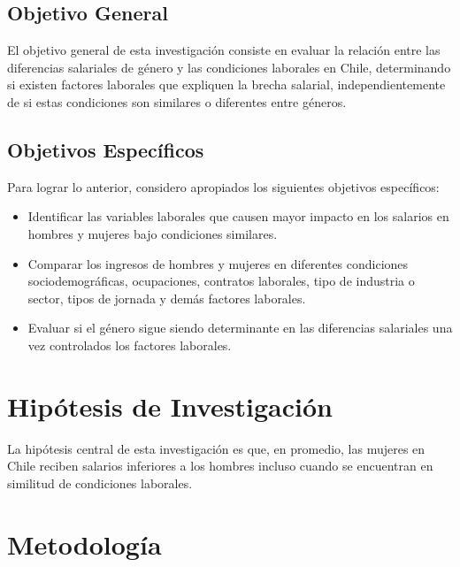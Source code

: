 \subsection{Objetivo General}


El objetivo general de esta investigación consiste en evaluar la relación entre las diferencias salariales de género y las condiciones laborales en Chile, determinando si existen factores laborales que expliquen la brecha salarial, independientemente de si estas condiciones son similares o diferentes entre géneros.

\subsection{Objetivos Específicos}


Para lograr lo anterior, considero apropiados los siguientes objetivos específicos:

\begin{itemize}
	\item Identificar las variables laborales que causen mayor impacto en los salarios en hombres y mujeres bajo condiciones similares.
	\item Comparar los ingresos de hombres y mujeres en diferentes condiciones sociodemográficas, ocupaciones,  contratos laborales, tipo de industria o sector, tipos de jornada y demás factores laborales.
	\item Evaluar si el género sigue siendo determinante en las diferencias salariales una vez controlados los factores laborales.
\end{itemize}

\section{Hipótesis de Investigación}

La hipótesis central de esta investigación es que, en promedio, las mujeres en Chile reciben salarios inferiores a los hombres incluso cuando se encuentran en similitud de condiciones laborales.

\section{Metodología} 

